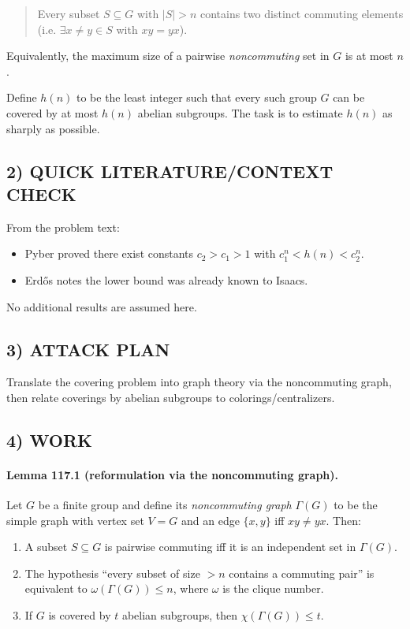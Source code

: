 \begin{quote}
Every subset $S\subseteq G$ with $|S|>n$ contains two distinct commuting elements (i.e. $\exists x\neq y\in S$ with $xy=yx$).
\end{quote}

Equivalently, the maximum size of a pairwise \emph{noncommuting} set in $G$ is at most $n$.

Define $h(n)$ to be the least integer such that every such group $G$ can be covered by at most $h(n)$ abelian subgroups.
The task is to estimate $h(n)$ as sharply as possible.

\subsection*{2) QUICK LITERATURE/CONTEXT CHECK}
From the problem text:
\begin{itemize}
\item Pyber proved there exist constants $c_2>c_1>1$ with $c_1^n<h(n)<c_2^n$.
\item Erd\H{o}s notes the lower bound was already known to Isaacs.
\end{itemize}
No additional results are assumed here.

\subsection*{3) ATTACK PLAN}
Translate the covering problem into graph theory via the noncommuting graph, then relate coverings by abelian subgroups to colorings/centralizers.

\subsection*{4) WORK}
\paragraph{Lemma 117.1 (reformulation via the noncommuting graph).}
Let $G$ be a finite group and define its \emph{noncommuting graph} $\Gamma(G)$ to be the simple graph with vertex set $V=G$ and an edge $\{x,y\}$ iff $xy\neq yx$.
Then:
\begin{enumerate}
\item A subset $S\subseteq G$ is pairwise commuting iff it is an independent set in $\Gamma(G)$.
\item The hypothesis ``every subset of size $>n$ contains a commuting pair'' is equivalent to $\omega(\Gamma(G))\le n$, where $\omega$ is the clique number.
\item If $G$ is covered by $t$ abelian subgroups, then $\chi(\Gamma(G))\le t$.
\end{enumerate}

